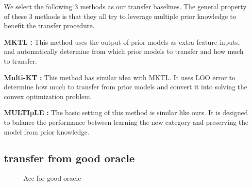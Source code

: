 We select the following 3 methods as our transfer baselines. The general property of these 3 methods is that they all try to leverage multiple prior knowledge to benefit the transfer procedure.

\textbf{MKTL \cite{jie2011multiclass}:} This method uses the output of prior models as extra feature inputs, and automatically determine from which prior models to transfer and how much to transfer.


\textbf{Multi-KT \cite{tommasi2014learning}:} This method has similar idea with MKTL. It uses LOO error to determine how much to transfer from prior models and convert it into solving the convex optimization problem.

\textbf{MULTIpLE \cite{kuzborskij2013n}:} The basic setting of this method is similar like ours. It is designed to balance the performance between learning the new category and preserving the model from prior knowledge.

\subsection{transfer from good oracle}
\begin{figure}
\centering

\newline
{}

\caption{Acc for good oracle}
\end{figure}

